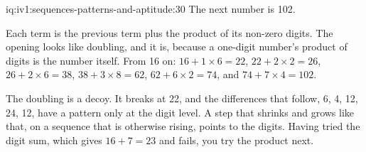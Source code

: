 \begin{solution}{iq:iv1:sequences-patterns-and-aptitude:30}
The next number is 102.

Each term is the previous term plus the product of its non-zero digits. The opening looks like doubling, and it is, because a one-digit number's product of digits is the number itself. From 16 on: $16 + 1 \times 6 = 22$, $22 + 2 \times 2 = 26$, $26 + 2 \times 6 = 38$, $38 + 3 \times 8 = 62$, $62 + 6 \times 2 = 74$, and $74 + 7 \times 4 = 102$.

The doubling is a decoy. It breaks at 22, and the differences that follow, 6, 4, 12, 24, 12, have a pattern only at the digit level. A step that shrinks and grows like that, on a sequence that is otherwise rising, points to the digits. Having tried the digit sum, which gives $16 + 7 = 23$ and fails, you try the product next.

\end{solution}
